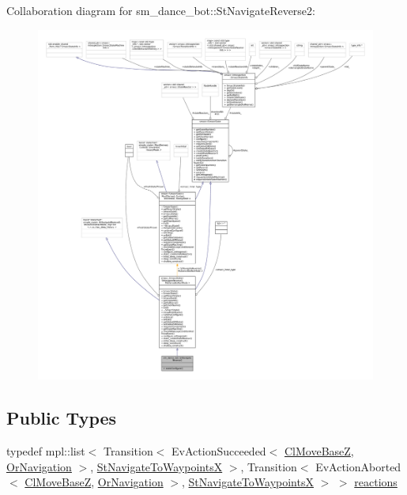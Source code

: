 Collaboration diagram for sm\+\_\+dance\+\_\+bot\+:\+:St\+Navigate\+Reverse2\+:
\nopagebreak
\begin{figure}[H]
\begin{center}
\leavevmode
\includegraphics[width=350pt]{structsm__dance__bot_1_1StNavigateReverse2__coll__graph}
\end{center}
\end{figure}
\subsection*{Public Types}
\begin{DoxyCompactItemize}
\item 
typedef mpl\+::list$<$ Transition$<$ Ev\+Action\+Succeeded$<$ \hyperlink{classcl__move__base__z_1_1ClMoveBaseZ}{Cl\+Move\+BaseZ}, \hyperlink{classsm__dance__bot_1_1OrNavigation}{Or\+Navigation} $>$, \hyperlink{structsm__dance__bot_1_1StNavigateToWaypointsX}{St\+Navigate\+To\+WaypointsX} $>$, Transition$<$ Ev\+Action\+Aborted$<$ \hyperlink{classcl__move__base__z_1_1ClMoveBaseZ}{Cl\+Move\+BaseZ}, \hyperlink{classsm__dance__bot_1_1OrNavigation}{Or\+Navigation} $>$, \hyperlink{structsm__dance__bot_1_1StNavigateToWaypointsX}{St\+Navigate\+To\+WaypointsX} $>$ $>$ \hyperlink{structsm__dance__bot_1_1StNavigateReverse2_a629dbeb24a7b120d7dfebeb4b9630d64}{reactions}
\end{DoxyCompactItemize}
